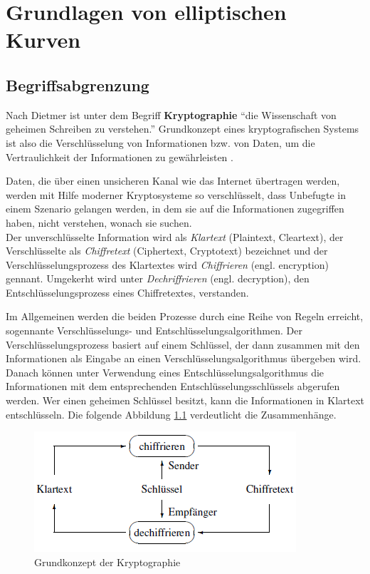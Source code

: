 \chapter{Grundlagen von elliptischen Kurven}

\section{Begriffsabgrenzung}


Nach Dietmer ist unter dem Begriff  \textbf{Kryptographie} \enquote{die Wissenschaft von geheimen Schreiben zu verstehen.} Grundkonzept eines kryptografischen Systems ist also die Verschlüsselung von Informationen bzw. von Daten, um die Vertraulichkeit der Informationen zu gewährleisten \cite{damer}.

Daten, die über einen unsicheren Kanal wie das Internet übertragen werden, werden mit Hilfe moderner Kryptosysteme so verschlüsselt, dass Unbefugte in einem Szenario gelangen werden, in dem sie auf die Informationen zugegriffen haben, nicht verstehen, wonach sie suchen\cite{moVarol}. \\
Der unverschlüsselte Information wird als \textit{Klartext} (Plaintext, Cleartext), der Verschlüsselte als \textit{Chiffretext} (Ciphertext, Cryptotext) bezeichnet und der Verschlüsselungsprozess des Klartextes wird \textit{Chiffrieren} (engl. encryption) gennant. Umgekerht wird unter \textit{Dechriffrieren} (engl. decryption), den Entschlüsselungsprozess eines Chiffretextes, verstanden.

Im Allgemeinen werden die beiden Prozesse durch eine Reihe von Regeln erreicht, sogennante Verschlüsselungs- und Entschlüsselungsalgorithmen. Der Verschlüsselungsprozess basiert auf einem Schlüssel, der dann zusammen mit den Informationen als Eingabe an einen Verschlüsselungsalgorithmus übergeben wird. 
Danach können unter Verwendung eines Entschlüsselungsalgorithmus die Informationen mit dem entsprechenden Entschlüsselungsschlüssels abgerufen werden. Wer einen geheimen Schlüssel besitzt, kann die Informationen in Klartext entschlüsseln\cite{moVarol}. Die folgende Abbildung \ref{konzept} verdeutlicht die Zusammenhänge.

\begin{figure}
    \centering
    \includegraphics[width = 0.5 \textwidth]{Graphics/Cipher.png}
    \caption{Grundkonzept der Kryptographie}
    \label{konzept}
\end{figure}


